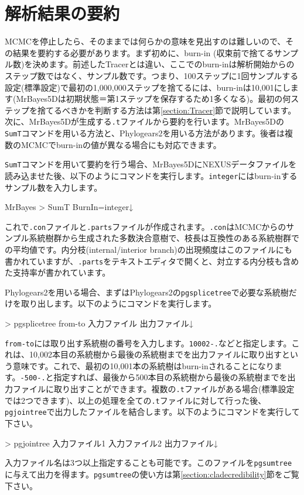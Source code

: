 \documentclass[titlepage,10pt,a4paper]{jsbook}
\newenvironment{cmd}{\begin{oframed}\raggedright\ttfamily\footnotesize\setlength{\baselineskip}{1.4em}}{\end{oframed}\vspace{-1em}}
\begin{document}
\section{解析結果の要約}\label{section:Summarize}

MCMCを停止したら、そのままでは何らかの意味を見出すのは難しいので、その結果を要約する必要があります。まず初めに、burn-in (収束前で捨てるサンプル数)を決めます。前述したTracerとは違い、ここでのburn-inは解析開始からのステップ数ではなく、サンプル数です。つまり、100ステップに1回サンプルする設定(標準設定)で最初の1,000,000ステップを捨てるには、burn-inは10,001にします(MrBayes5Dは初期状態＝第1ステップを保存するため1多くなる)。最初の何ステップを捨てるべきかを判断する方法は第\ref{section:Tracer}節で説明しています。次に、MrBayes5Dが生成する\texttt{.t}ファイルから要約を行います。MrBayes5Dの\texttt{SumT}コマンドを用いる方法と、Phylogears2を用いる方法があります。後者は複数のMCMCでburn-inの値が異なる場合にも対応できます。

\texttt{SumT}コマンドを用いて要約を行う場合、MrBayes5DにNEXUSデータファイルを読み込ませた後、以下のようにコマンドを実行します。\texttt{integer}にはburn-inするサンプル数を入力します。
\begin{cmd}
MrBayes {\textgreater} SumT BurnIn=integer↓
\end{cmd}
これで\texttt{.con}ファイルと\texttt{.parts}ファイルが作成されます。\texttt{.con}はMCMCからのサンプル系統樹群から生成された多数決合意樹で、枝長は互換性のある系統樹群での平均値です。内分枝(internal/interior branch)の出現頻度はこのファイルにも書かれていますが、\texttt{.parts}をテキストエディタで開くと、対立する内分枝も含めた支持率が書かれています。

Phylogears2を用いる場合、まずはPhylogears2の\texttt{pgsplicetree}で必要な系統樹だけを取り出します。以下のようにコマンドを実行します。
\begin{cmd}
{\textgreater} pgsplicetree from-to 入力ファイル 出力ファイル↓
\end{cmd}
\texttt{from-to}には取り出す系統樹の番号を入力します。\texttt{10002-.}などと指定します。これは、10,002本目の系統樹から最後の系統樹までを出力ファイルに取り出すという意味です。これで、最初の10,001本の系統樹はburn-inされることになります。\texttt{-500-.}と指定すれば、最後から500本目の系統樹から最後の系統樹までを出力ファイルに取り出すことができます。複数の\texttt{.t}ファイルがある場合(標準設定では2つできます)、以上の処理を全ての\texttt{.t}ファイルに対して行った後、\texttt{pgjointree}で出力したファイルを結合します。以下のようにコマンドを実行して下さい。
\begin{cmd}
{\textgreater} pgjointree 入力ファイル1 入力ファイル2 出力ファイル↓
\end{cmd}
入力ファイル名は3つ以上指定することも可能です。このファイルを\texttt{pgsumtree}に与えて出力を得ます。\texttt{pgsumtree}の使い方は第\ref{section:cladecredibility}節をご覧下さい。
\end{document}
